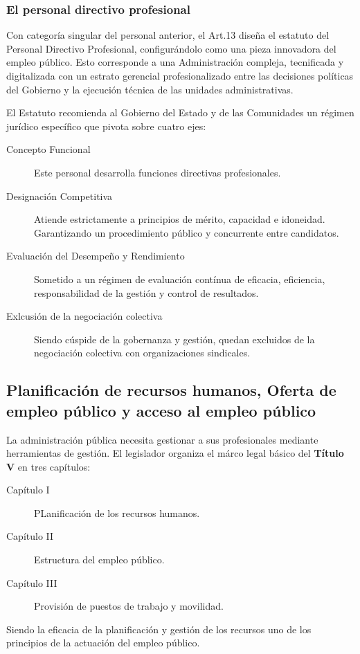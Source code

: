     \subsubsection{El personal directivo profesional} %
        Con categoría singular del personal anterior, el Art.13 diseña el estatuto del Personal Directivo Profesional, configurándolo como una pieza innovadora del empleo público. Esto corresponde a una Administración compleja, tecnificada y digitalizada con un estrato gerencial profesionalizado entre las decisiones políticas del Gobierno y la ejecución técnica de las unidades administrativas. 

        El Estatuto recomienda al Gobierno del Estado y de las Comunidades un régimen jurídico específico que pivota sobre cuatro ejes:

        \begin{description}
            \item[Concepto Funcional] Este personal desarrolla funciones directivas profesionales.
            \item[Designación Competitiva] Atiende estrictamente a principios de mérito, capacidad e idoneidad. Garantizando un procedimiento público y concurrente entre candidatos.
            \item[Evaluación del Desempeño y Rendimiento] Sometido a un régimen de evaluación contínua de eficacia, eficiencia, responsabilidad de la gestión y control de resultados.
            \item[Exlcusión de la negociación colectiva] Siendo cúspide de la gobernanza y gestión, quedan excluidos de  la negociación colectiva con organizaciones sindicales.
        \end{description}

\subsection{Planificación de recursos humanos, Oferta de empleo público y acceso al empleo público} %
    La administración pública necesita gestionar a sus profesionales mediante herramientas de gestión. El legislador organiza el márco legal básico del \textbf{Título V} en tres capítulos:
    \begin{description}
        \item[Capítulo I] PLanificación de los recursos humanos.
        \item[Capítulo II] Estructura del empleo público.
        \item[Capítulo III] Provisión de puestos de trabajo y movilidad.
    \end{description}
    Siendo la eficacia de la planificación y gestión de los recursos uno de los principios de la actuación del empleo público.


